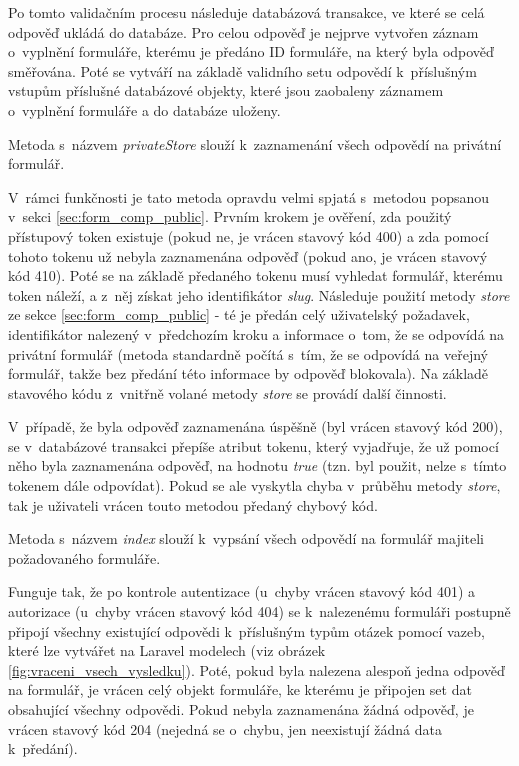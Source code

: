 			Po tomto validačním procesu následuje databázová transakce, ve které se celá odpověď ukládá do databáze. Pro celou odpověď je nejprve vytvořen záznam o~vyplnění formuláře, kterému je předáno ID formuláře, na který byla odpověď směřována. Poté se vytváří na základě validního setu odpovědí k~příslušným vstupům příslušné databázové objekty, které jsou zaobaleny záznamem o~vyplnění formuláře a do databáze uloženy.
			
			\label{sec:form_comp_private}
			Metoda s~názvem \textit{privateStore} slouží k~zaznamenání všech odpovědí na privátní formulář.
			
			V~rámci funkčnosti je tato metoda opravdu velmi spjatá s~metodou popsanou v~sekci \ref{sec:form_comp_public}. Prvním krokem je ověření, zda použitý přístupový token existuje (pokud ne, je vrácen stavový kód 400) a zda pomocí tohoto tokenu už nebyla zaznamenána odpověď (pokud ano, je vrácen stavový kód 410). Poté se na základě předaného tokenu musí vyhledat formulář, kterému token náleží, a z~něj získat jeho identifikátor \textit{slug}. Následuje použití metody \textit{store} ze sekce \ref{sec:form_comp_public} - té je předán celý uživatelský požadavek, identifikátor nalezený v~předchozím kroku a informace o~tom, že se odpovídá na privátní formulář (metoda standardně počítá s~tím, že se odpovídá na veřejný formulář, takže bez předání této informace by odpověď blokovala). Na základě stavového kódu z~vnitřně volané metody \textit{store} se provádí další činnosti. 
			
			V~případě, že byla odpověď zaznamenána úspěšně (byl vrácen stavový kód 200), se v~databázové transakci přepíše atribut tokenu, který vyjadřuje, že už pomocí něho byla zaznamenána odpověď, na hodnotu \textit{true} (tzn. byl použit, nelze s~tímto tokenem dále odpovídat). Pokud se ale vyskytla chyba v~průběhu metody \textit{store}, tak je uživateli vrácen touto metodou předaný chybový kód.
			
			\label{sec:form_comp_private_index}
			Metoda s~názvem \textit{index} slouží k~vypsání všech odpovědí na formulář majiteli požadovaného formuláře.
			
			Funguje tak, že po kontrole autentizace (u~chyby vrácen stavový kód 401) a autorizace (u~chyby vrácen stavový kód 404) se k~nalezenému formuláři postupně připojí všechny existující odpovědi k~příslušným typům otázek pomocí vazeb, které lze vytvářet na Laravel modelech (viz obrázek \ref{fig:vraceni_vsech_vysledku}). Poté, pokud byla nalezena alespoň jedna odpověď na formulář, je vrácen celý objekt formuláře, ke kterému je připojen set dat obsahující všechny odpovědi. Pokud nebyla zaznamenána žádná odpověď, je vrácen stavový kód 204 (nejedná se o~chybu, jen neexistují žádná data k~předání).
			
